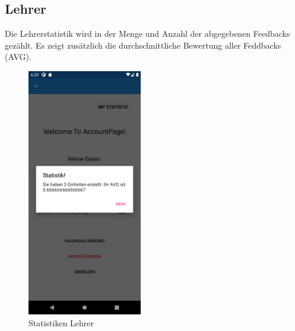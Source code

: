 \subsection{Lehrer}
Die Lehrerstatistik wird in der Menge und Anzahl der abgegebenen Feedbacks gezählt. Es zeigt zusätzlich die durchschnittliche Bewertung aller Feddbacks (AVG).
\begin{figure}[h]
    \begin{center}
        \includegraphics[width=5cm]{pics/Xamarin Lehrer/1 Stat.png}\hfill
        \caption[Statistiken Lehrer Ansicht]{Statistiken Lehrer}
        \end{center}
\end{figure}
\newpage